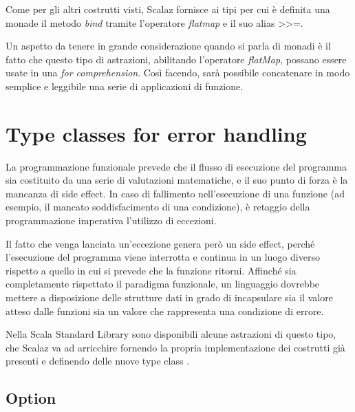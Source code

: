 Come per gli altri costrutti visti, Scalaz fornisce ai tipi per cui è definita una monade il metodo \textit{bind} tramite l'operatore \textit{flatmap} e il suo alias >>=.



Un aspetto da tenere in grande considerazione quando si parla di monadi è il fatto che questo tipo di astrazioni, abilitando l'operatore \textit{flatMap}, possano essere usate in una \textit{for comprehension}. Così facendo, sarà possibile concatenare in modo semplice e leggibile una serie di applicazioni di funzione.




\section{Type classes for error handling}

La programmazione funzionale prevede che il flusso di esecuzione del programma sia costituito da una serie di valutazioni matematiche, e il suo punto di forza è la mancanza di side effect. In caso di fallimento nell'esecuzione di una funzione (ad esempio, il mancato soddisfacimento di una condizione), è retaggio della programmazione imperativa l'utilizzo di eccezioni.

Il fatto che venga lanciata un'eccezione genera però un side effect, perché l'esecuzione del programma viene interrotta e continua in un luogo diverso rispetto a quello in cui si prevede che la funzione ritorni. Affinché sia completamente rispettato il paradigma funzionale, un linguaggio dovrebbe mettere a disposizione delle strutture dati in grado di incapsulare sia il valore atteso dalle funzioni sia un valore che rappresenta una condizione di errore.

Nella Scala Standard Library sono disponibili alcune astrazioni di questo tipo, che Scalaz va ad arricchire fornendo la propria implementazione dei costrutti già presenti e definendo delle nuove type class \cite{ScalazDummies}.

\subsection{Option}

